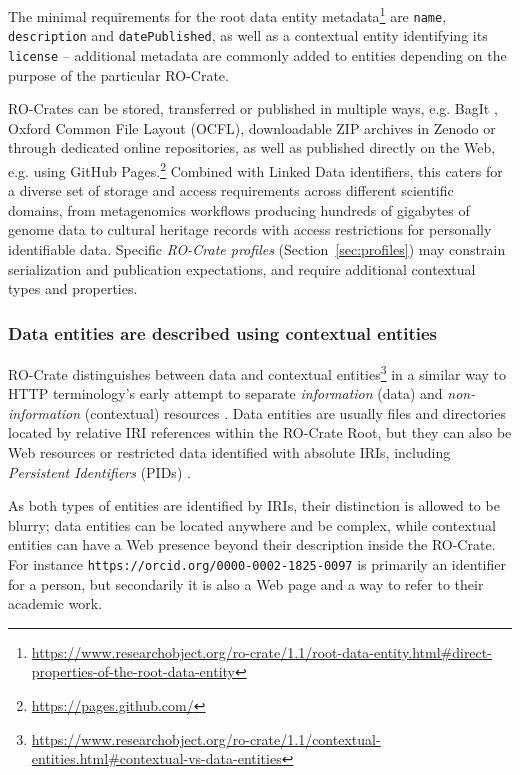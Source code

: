 \documentclass[ds,v1.1.2,openaccess]{iosart2x}%
\begin{document}
The minimal requirements for the root data entity
metadata\footnote{\url{https://www.researchobject.org/ro-crate/1.1/root-data-entity.html\#direct-properties-of-the-root-data-entity}}
are \texttt{name}, \texttt{description} and \texttt{datePublished}, as well as a contextual
entity identifying its \texttt{license} -- additional metadata are commonly
added to entities depending on the purpose of the particular RO-Crate.

RO-Crates can be stored, transferred or published in multiple ways,
e.g. BagIt \cite{doi:10.17487/rfc8493}, Oxford Common File Layout
\cite{ocfl_2020} (OCFL), downloadable ZIP archives in Zenodo or through
dedicated online repositories, as well as published directly on the
Web, e.g. using GitHub Pages.\footnote{\url{https://pages.github.com/}} Combined
with Linked Data identifiers, this caters for a diverse set of storage
and access requirements across different scientific domains, from
metagenomics workflows producing hundreds of gigabytes of genome data
to cultural heritage records with access restrictions for personally
identifiable data. Specific \textit{RO-Crate profiles} (Section~\ref{sec:profiles}) may constrain serialization and publication
expectations, and require additional contextual types and properties.

\subsubsection{Data entities are described using contextual entities}%

\label{sec:contextualentities}

RO-Crate distinguishes between data and contextual
entities\footnote{\url{https://www.researchobject.org/ro-crate/1.1/contextual-entities.html\#contextual-vs-data-entities}}
in a similar way to HTTP terminology's early attempt to separate
\textit{information} (data) and \textit{non-information} (contextual) resources
\cite{httprange14}. Data entities are usually files and directories located
by relative IRI references within the RO-Crate Root, but they can also
be Web resources or restricted data identified with absolute IRIs,
including \textit{Persistent Identifiers} (PIDs) \cite{doi:10.1371/journal.pbio.2001414}.

As both types of entities are identified by IRIs, their distinction is
allowed to be blurry; data entities can be located anywhere and be
complex, while contextual entities can have a Web presence beyond their
description inside the RO-Crate. For instance
\texttt{https://orcid.org/0000-0002-1825-0097} is primarily an identifier for
a person, but secondarily it is also a Web page and a way to refer to
their academic work.
\end{document}
